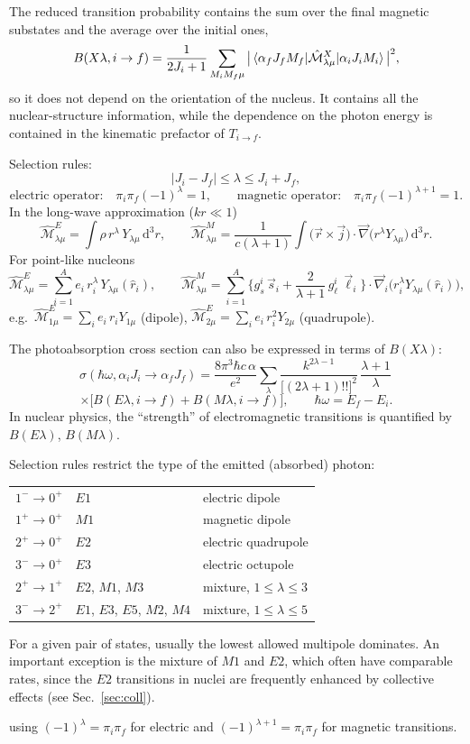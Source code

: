 \documentclass[11pt,a4paper]{article}
\newcommand{\op}[1]{\hat{#1}}
\newcommand{\ud}{\mathrm{d}}
\begin{document}
The reduced transition probability contains the sum over the final magnetic substates and the average over the initial ones,
\[
B(X\lambda,i\to f)=\frac{1}{2J_i+1}\sum_{M_iM_f\mu}\big|\braket{\alpha_fJ_fM_f|\op{\mathcal M}^X_{\lambda\mu}|\alpha_iJ_iM_i}\big|^2 ,
\]
so it does not depend on the orientation of the nucleus. It contains all the nuclear-structure information, while the dependence on the photon energy is contained in the kinematic prefactor of $T_{i\to f}$.

Selection rules:
\[
|J_i-J_f|\le\lambda\le J_i+J_f ,
\]
\[
\text{electric operator:}\quad \pi_i\pi_f(-1)^\lambda=1,\qquad
\text{magnetic operator:}\quad \pi_i\pi_f(-1)^{\lambda+1}=1 .
\]
In the long-wave approximation ($kr\ll1$)
\[
\op{\mathcal M}^E_{\lambda\mu}=\int\rho\,r^\lambda\,Y_{\lambda\mu}\,\ud^3r,
\qquad
\op{\mathcal M}^M_{\lambda\mu}=\frac{1}{c(\lambda+1)}\int\big(\vec r\times\vec j\big)\cdot\vec\nabla\big(r^\lambda Y_{\lambda\mu}\big)\,\ud^3r .
\]
For point-like nucleons
\[
\op{\mathcal M}^E_{\lambda\mu}=\sum_{i=1}^Ae_i\,r_i^\lambda\,Y_{\lambda\mu}(\hat r_i),
\qquad
\op{\mathcal M}^M_{\lambda\mu}=\sum_{i=1}^A\Big\{g_s^i\,\vec s_i+\frac{2}{\lambda+1}\,g_\ell^i\,\vec\ell_i\Big\}\cdot\vec\nabla_i\big(r_i^\lambda Y_{\lambda\mu}(\hat r_i)\big),
\]
e.g.\ $\op{\mathcal M}^E_{1\mu}=\sum_ie_i\,r_iY_{1\mu}$ (dipole), $\op{\mathcal M}^E_{2\mu}=\sum_ie_i\,r_i^2Y_{2\mu}$ (quadrupole).

The photoabsorption cross section can also be expressed in terms of $B(X\lambda)$:
\[
\sigma(\hbar\omega,\alpha_iJ_i\to\alpha_fJ_f)=\frac{8\pi^3\hbar c\,\alpha}{e^2}\sum_\lambda\frac{k^{2\lambda-1}}{\big[(2\lambda+1)!!\big]^2}\,\frac{\lambda+1}{\lambda}\,
\]
\[
\times\Big[B(E\lambda,i\to f)+B(M\lambda,i\to f)\Big],
\qquad \hbar\omega=E_f-E_i .
\]
In nuclear physics, the ``strength'' of electromagnetic transitions is quantified by $B(E\lambda)$, $B(M\lambda)$.

Selection rules restrict the type of the emitted (absorbed) photon:
\begin{center}
\begin{tabular}{l l l}
$1^-\to0^+$ & $E1$ & electric dipole\\
$1^+\to0^+$ & $M1$ & magnetic dipole\\
$2^+\to0^+$ & $E2$ & electric quadrupole\\
$3^-\to0^+$ & $E3$ & electric octupole\\
$2^+\to1^+$ & $E2$, $M1$, $M3$ & mixture, $1\le\lambda\le3$\\
$3^-\to2^+$ & $E1$, $E3$, $E5$, $M2$, $M4$ & mixture, $1\le\lambda\le5$
\end{tabular}

For a given pair of states, usually the lowest allowed multipole dominates. An important exception is the mixture of $M1$ and $E2$, which often have comparable rates, since the $E2$ transitions in nuclei are frequently enhanced by collective effects (see Sec.~\ref{sec:coll}).

\end{center}
using $(-1)^\lambda=\pi_i\pi_f$ for electric and $(-1)^{\lambda+1}=\pi_i\pi_f$ for magnetic transitions.
\end{document}
